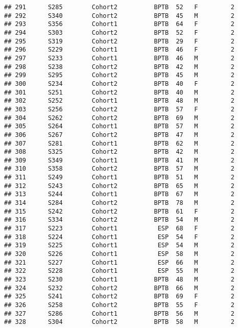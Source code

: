 \documentclass[
]{article}
\begin{document}
\begin{verbatim}
## 291      S285        Cohort2          BPTB  52   F         2      
## 292      S340        Cohort2          BPTB  45   M         2      
## 293      S356        Cohort1          BPTB  64   F         2      
## 294      S303        Cohort2          BPTB  52   F         2      
## 295      S319        Cohort2          BPTB  29   F         2      
## 296      S229        Cohort1          BPTB  46   F         2      
## 297      S233        Cohort1          BPTB  46   M         2      
## 298      S238        Cohort2          BPTB  42   M         2      
## 299      S295        Cohort2          BPTB  45   M         2      
## 300      S234        Cohort2          BPTB  40   F         2      
## 301      S251        Cohort2          BPTB  40   M         2      
## 302      S252        Cohort1          BPTB  48   M         2      
## 303      S256        Cohort2          BPTB  57   F         2      
## 304      S262        Cohort2          BPTB  69   M         2      
## 305      S264        Cohort1          BPTB  57   M         2      
## 306      S267        Cohort2          BPTB  47   M         2      
## 307      S281        Cohort1          BPTB  62   M         2      
## 308      S325        Cohort2          BPTB  42   M         2      
## 309      S349        Cohort1          BPTB  41   M         2      
## 310      S358        Cohort2          BPTB  57   M         2      
## 311      S249        Cohort1          BPTB  51   M         2      
## 312      S243        Cohort2          BPTB  65   M         2      
## 313      S244        Cohort1          BPTB  67   M         2      
## 314      S284        Cohort2          BPTB  78   M         2      
## 315      S242        Cohort2          BPTB  61   F         2      
## 316      S334        Cohort2          BPTB  54   M         2      
## 317      S223        Cohort1           ESP  68   F         2      
## 318      S224        Cohort1           ESP  54   F         2      
## 319      S225        Cohort1           ESP  54   M         2      
## 320      S226        Cohort1           ESP  58   M         2      
## 321      S227        Cohort1           ESP  66   M         2      
## 322      S228        Cohort1           ESP  55   M         2      
## 323      S230        Cohort1          BPTB  48   M         2      
## 324      S232        Cohort2          BPTB  66   M         2      
## 325      S241        Cohort2          BPTB  69   F         2      
## 326      S258        Cohort2          BPTB  55   F         2      
## 327      S286        Cohort1          BPTB  56   M         2      
## 328      S304        Cohort2          BPTB  58   M         2      

\end{verbatim}
\end{document}
